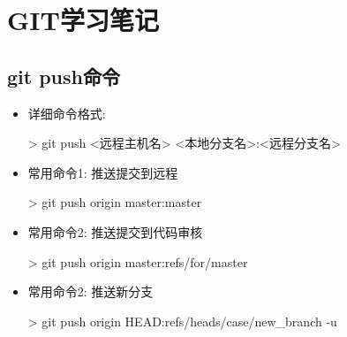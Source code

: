 \section{GIT学习笔记}
\subsection{git push命令}
\begin{itemize}
\item 详细命令格式:
\begin{commandbox}
 > git push <远程主机名> <本地分支名>:<远程分支名>
\end{commandbox}
\item 常用命令1: 推送提交到远程
\begin{commandbox}
 > git push origin master:master
\end{commandbox}
\item 常用命令2: 推送提交到代码审核
\begin{commandbox}
 > git push origin master:refs/for/master
\end{commandbox}
\item 常用命令2: 推送新分支
\begin{commandbox}
 > git push origin HEAD:refs/heads/case/new_branch -u 
\end{commandbox}

\end{itemize}

